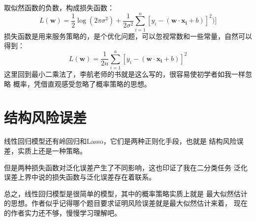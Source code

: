 \documentclass{article}
\begin{document}
取似然函数的负数，构成损失函数：
\[L(\boldsymbol{w})=\frac{1}{2}\log(2\pi \sigma^2)+\frac{1}{2
\sigma ^2}\sum_{i=1}^{n}[y_i-(\boldsymbol{w}\cdot \boldsymbol{x_i}+b)]^2)]\]
损失函数是用来服务策略的，是个优化问题，可以忽视常数和一些常量，自然可以得到：
\[L(\boldsymbol{w})=\frac{1}{2n}\sum_{i=1}^{n}
[y_i-(\boldsymbol{w}\cdot \boldsymbol{x_i}+b)]^2\]
这里回到最小二乘法了，李航老师的书就是这么写的，很容易使初学者如我一样忽略
概率，凭借直观感受忽略了概率策略的思想。

\section{结构风险误差}
线性回归模型还有岭回归和Lasso，它们是两种正则化手段，也就是
结构风险误差，实质上还是一种策略。

但是两种损失函数对泛化误差产生了不同影响，这也印证了我在二分类任务
泛化误差上界中说的损失函数与泛化误差存在着联系。

总之，线性回归模型是很简单的模型，其中的概率策略实质上就是
最大似然估计的思想。作者似乎记得哪个题目要求证明风险误差就是最大似然估计来着，
现在的作者实力还不够，慢慢学习理解吧。
\end{document}

